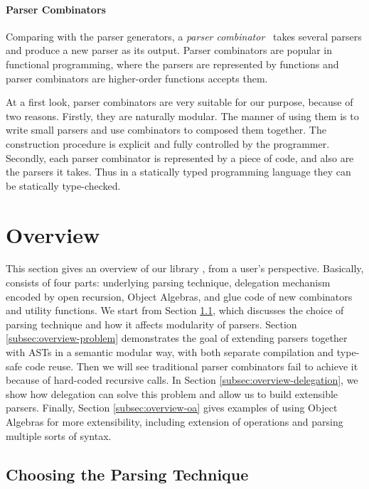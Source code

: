 \paragraph{Parser Combinators}
Comparing with the parser generators, a \textit{parser combinator}~\cite{burge1975,Wadler1985}
takes several parsers and produce a new parser as its output. Parser combinators are
popular in functional programming, where the parsers are represented
by functions and parser combinators are higher-order functions accepts
them.

At a first look, parser combinators are very suitable for our purpose, because of two
reasons. Firstly, they are naturally modular. The manner of using them
is to write small parsers and use combinators to composed them
together. The construction procedure is explicit and fully controlled
by the programmer. Secondly, each parser combinator is represented by
a piece of code, and also are the parsers it takes. Thus in a
statically typed programming language they can be statically
type-checked.

\section{Overview}\label{sec:overview}

This section gives an overview of our library \name, from a user's perspective. Basically, \name consists of four parts: underlying parsing technique, delegation mechanism encoded by open recursion, Object Algebras, and glue code of new combinators and utility functions. We start from Section \ref{subsec:overview-parsing}, which discusses the choice of parsing technique and how it affects modularity of parsers. Section \ref{subsec:overview-problem} demonstrates the goal of extending parsers together with ASTs in a semantic modular way, with both separate compilation and type-safe code reuse. Then we will see traditional parser combinators fail to achieve it because of hard-coded recursive calls. In Section \ref{subsec:overview-delegation}, we show how delegation can solve this problem and allow us to build extensible parsers. Finally, Section \ref{subsec:overview-oa} gives examples of using Object Algebras for more extensibility, including extension of operations and parsing multiple sorts of syntax.

\subsection{Choosing the Parsing Technique}\label{subsec:overview-parsing}

